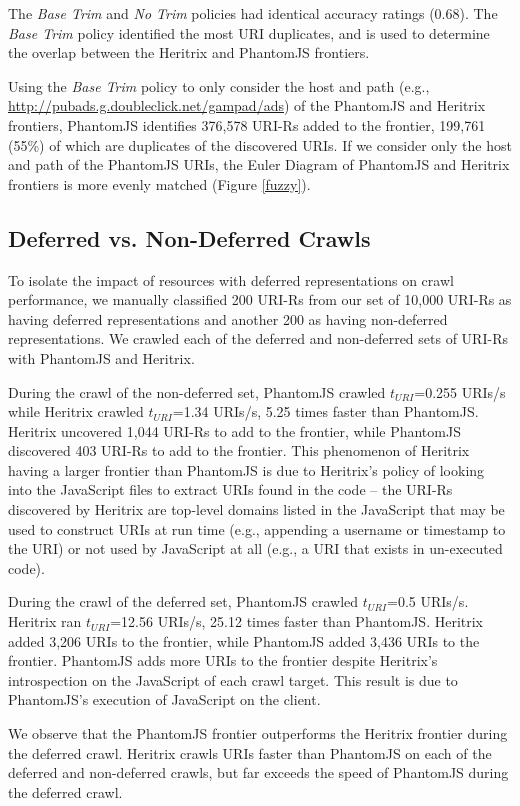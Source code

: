 \documentclass{ipres_proc_article-sp}
\begin{document}
The \emph{Base Trim} and \emph{No Trim} policies had identical accuracy ratings (0.68). The \emph{Base Trim} policy identified the most URI duplicates, and is used to determine the overlap between the Heritrix and PhantomJS frontiers.

Using the \emph{Base Trim} policy to only consider the host and path (e.g., \url{http://pubads.g.doubleclick.net/gampad/ads}) of the PhantomJS and Heritrix frontiers, PhantomJS identifies 376,578 URI-Rs added to the frontier, 199,761 (55\%) of which are duplicates of the discovered URIs. If we consider only the host and path of the PhantomJS URIs, the Euler Diagram of PhantomJS and Heritrix frontiers is more evenly matched (Figure \ref{fuzzy}).


\subsection{Deferred vs. Non-Deferred Crawls}
\label{deferVnon}
To isolate the impact of resources with deferred representations on crawl performance, we manually classified 200 URI-Rs from our set of 10,000 URI-Rs as having deferred representations and another 200 as having non-deferred representations. We crawled each of the deferred and non-deferred sets of URI-Rs with PhantomJS and Heritrix. 

During the crawl of the non-deferred set, PhantomJS crawled $t_{URI}$=0.255 URIs/s while Heritrix crawled $t_{URI}$=1.34 URIs/s, 5.25 times faster than PhantomJS. Heritrix uncovered 1,044 URI-Rs to add to the frontier, while PhantomJS discovered 403 URI-Rs to add to the frontier. This phenomenon of Heritrix having a larger frontier than PhantomJS is due to Heritrix's policy of looking into the JavaScript files to extract URIs found in the code -- the URI-Rs discovered by Heritrix are top-level domains listed in the JavaScript that may be used to construct URIs at run time (e.g., appending a username or timestamp to the URI) or not used by JavaScript at all (e.g., a URI that exists in un-executed code). 

During the crawl of the deferred set, PhantomJS crawled $t_{URI}$=0.5 URIs/s. Heritrix ran $t_{URI}$=12.56 URIs/s, 25.12 times faster than PhantomJS. Heritrix added 3,206 URIs to the frontier, while PhantomJS added 3,436 URIs to the frontier. PhantomJS adds more URIs to the frontier despite Heritrix's introspection on the JavaScript of each crawl target. This result is due to PhantomJS's execution of JavaScript on the client.

We observe that the PhantomJS frontier outperforms the Heritrix frontier during the deferred crawl. Heritrix crawls URIs faster than PhantomJS on each of the deferred and non-deferred crawls, but far exceeds the speed of PhantomJS during the deferred crawl.
\end{document}
